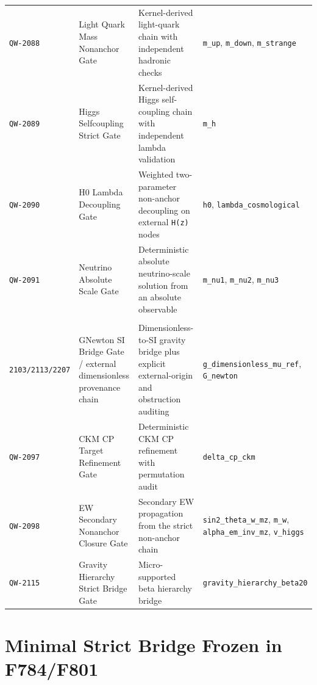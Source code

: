 \documentclass[11pt,a4paper]{article}
\begin{document}
\begin{longtable}{@{}p{1.9cm}p{4.0cm}p{5.0cm}p{4.1cm}@{}}
\texttt{QW-2088} &
Light Quark Mass Nonanchor Gate &
Kernel-derived light-quark chain with independent hadronic checks &
\texttt{m\_up}, \texttt{m\_down}, \texttt{m\_strange} \\

\texttt{QW-2089} &
Higgs Selfcoupling Strict Gate &
Kernel-derived Higgs self-coupling chain with independent lambda validation &
\texttt{m\_h} \\

\texttt{QW-2090} &
H0 Lambda Decoupling Gate &
Weighted two-parameter non-anchor decoupling on external \texttt{H(z)} nodes &
\texttt{h0}, \texttt{lambda\_cosmological} \\

\texttt{QW-2091} &
Neutrino Absolute Scale Gate &
Deterministic absolute neutrino-scale solution from an absolute observable &
\texttt{m\_nu1}, \texttt{m\_nu2}, \texttt{m\_nu3} \\

\shortstack[l]{\texttt{QW-2092/2101/}\\\texttt{2103/2113/2207}} &
GNewton SI Bridge Gate / external dimensionless provenance chain &
Dimensionless-to-SI gravity bridge plus explicit external-origin and obstruction auditing &
\texttt{g\_dimensionless\_mu\_ref}, \texttt{G\_newton} \\

\texttt{QW-2097} &
CKM CP Target Refinement Gate &
Deterministic CKM CP refinement with permutation audit &
\texttt{delta\_cp\_ckm} \\

\texttt{QW-2098} &
EW Secondary Nonanchor Closure Gate &
Secondary EW propagation from the strict non-anchor chain &
\texttt{sin2\_theta\_w\_mz}, \texttt{m\_w}, \texttt{alpha\_em\_inv\_mz}, \texttt{v\_higgs} \\

\texttt{QW-2115} &
Gravity Hierarchy Strict Bridge Gate &
Micro-supported beta hierarchy bridge &
\texttt{gravity\_hierarchy\_beta20} \\
\bottomrule
\end{longtable}
\normalsize

\section{Minimal Strict Bridge Frozen in F784/F801}
\end{document}
